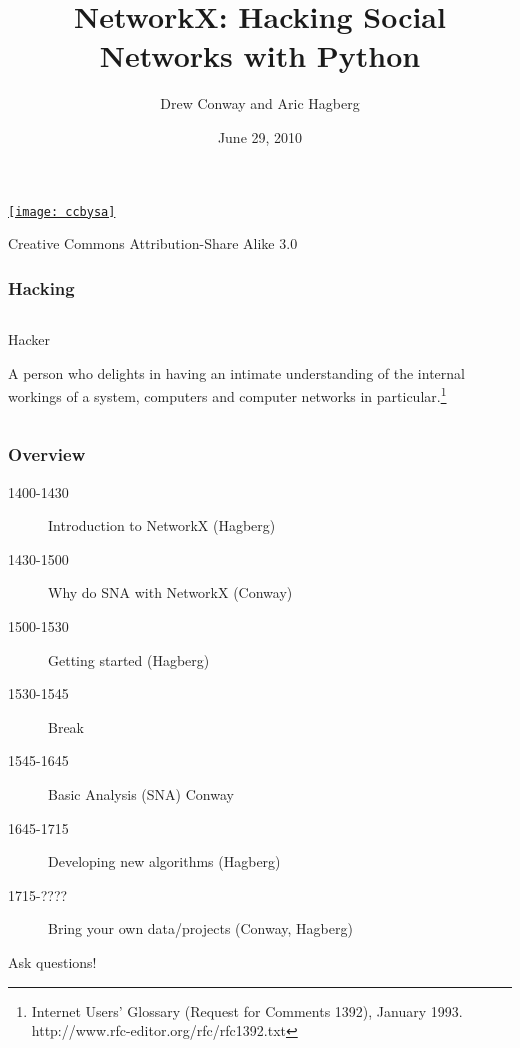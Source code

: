 \documentclass[xcolor=dvipsnames, 9pt]{beamer}
\title{NetworkX: Hacking Social Networks with Python}
\author{Drew Conway and Aric Hagberg}
\date{June 29, 2010}
\begin{document}
\begin{frame}[plain]
\titlepage

\tiny
\href{http://creativecommons.org/licenses/by-sa/3.0/us/}{\texttt{[image: ccbysa]}}

Creative Commons Attribution-Share Alike 3.0 
\end{frame}

\begin{frame}
\frametitle{Hacking}

\begin{columns}
\begin{column}{0.7\columnwidth}
\LARGE
Hacker

      A person who delights in having an intimate understanding of the
      internal workings of a system, computers and computer networks in
      particular.\footnote{
Internet Users' Glossary (Request for Comments 1392), January 1993.
http://www.rfc-editor.org/rfc/rfc1392.txt}
  
\end{column}
\end{columns}


\end{frame}

\begin{frame}
\frametitle{Overview}

\begin{description}

\item[1400-1430] Introduction to NetworkX (Hagberg)

\item[1430-1500]  Why do SNA with NetworkX (Conway)

\item[1500-1530] Getting started (Hagberg)

\item[1530-1545] Break

\item[1545-1645]  Basic Analysis (SNA) Conway

\item[1645-1715] Developing new algorithms (Hagberg)

\item[1715-????] Bring your own data/projects (Conway, Hagberg)

\end{description}

Ask questions!

\end{frame}
\end{document}
